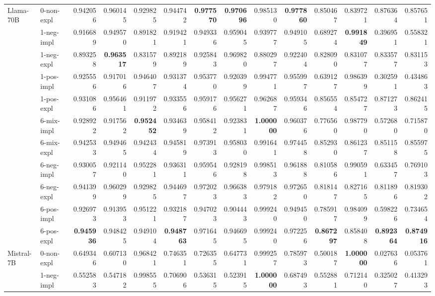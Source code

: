 \begin{tabular}{ll|rrrr|rrrr|rrrr}
 \midrule
\multirow[c]{11}{*}{Llama-70B} & 0-non-expl & 0.942056 & 0.960145 & 0.929825 & 0.944742 & \bfseries 0.977570 & \bfseries 0.970696 & 0.985130 & \bfseries 0.977860 & 0.850467 & 0.839721 & 0.876364 & 0.857651 \\
 & 1-neg-impl & 0.916689 & 0.949570 & 0.891821 & 0.919421 & 0.949336 & 0.959045 & 0.939777 & 0.949105 & 0.689274 & \bfseries 0.991849 & 0.396951 & 0.558321 \\
 & 1-neg-expl & 0.893258 & \bfseries 0.963517 & 0.831579 & 0.892189 & 0.925843 & 0.969820 & 0.880297 & 0.922404 & 0.828090 & 0.831077 & 0.833577 & 0.831153 \\
 & 1-pos-impl & 0.925556 & 0.917016 & 0.946407 & 0.931374 & 0.953770 & 0.920399 & 0.994771 & 0.955997 & 0.639127 & 0.986399 & 0.302591 & 0.434863 \\
 & 1-pos-expl & 0.931086 & 0.956461 & 0.911972 & 0.933556 & 0.959176 & 0.956271 & 0.962687 & 0.959346 & 0.856554 & 0.854727 & 0.871273 & 0.862415 \\
 & 6-mix-impl & 0.928922 & 0.917562 & \bfseries 0.952452 & 0.934639 & 0.958412 & 0.923831 & \bfseries 1.000000 & 0.960376 & 0.776560 & 0.987790 & 0.572680 & 0.715870 \\
 & 6-mix-expl & 0.942533 & 0.949465 & 0.942434 & 0.945819 & 0.973913 & 0.958030 & 0.991641 & 0.974458 & 0.852930 & 0.861237 & 0.851158 & 0.855975 \\
 & 6-neg-impl & 0.930057 & 0.921140 & 0.952281 & 0.936311 & 0.959546 & 0.928198 & 0.998513 & 0.961888 & 0.810586 & 0.990591 & 0.633457 & 0.769103 \\
 & 6-neg-expl & 0.941399 & 0.960299 & 0.929825 & 0.944697 & 0.972023 & 0.966383 & 0.979182 & 0.972650 & 0.818147 & 0.827165 & 0.811896 & 0.819302 \\
 & 6-pos-impl & 0.926973 & 0.913953 & 0.951221 & 0.932187 & 0.947023 & 0.904443 & 0.999240 & 0.949450 & 0.785917 & 0.984099 & 0.598226 & 0.734654 \\
 & 6-pos-expl & \bfseries 0.945936 & 0.948425 & 0.949104 & \bfseries 0.948763 & 0.971645 & 0.946695 & 0.999240 & 0.972256 & \bfseries 0.867297 & 0.858408 & \bfseries 0.892364 & \bfseries 0.874916 \\
 \midrule
\multirow[c]{11}{*}{Mistral-7B} & 0-non-expl & 0.649346 & 0.607130 & 0.968421 & 0.746351 & 0.726355 & 0.647731 & 0.999257 & 0.785973 & 0.500187 & \bfseries 1.000000 & 0.027636 & 0.053761 \\
 & 1-neg-impl & 0.552583 & 0.547182 & 0.998555 & 0.706906 & 0.536315 & 0.523915 & \bfseries 1.000000 & 0.687493 & 0.552881 & 0.712140 & 0.325027 & 0.413293 \\

\end{tabular}
